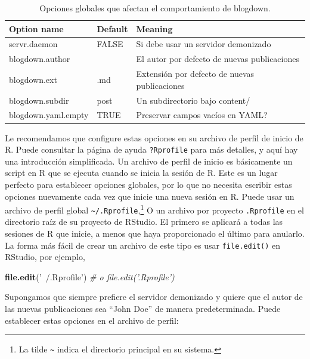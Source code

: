 \documentclass[12pt,]{krantz}
\makeatletter
\newenvironment{Shaded}{\begin{snugshade}}{\end{snugshade}}
\newcommand{\CommentTok}[1]{\textcolor[rgb]{0.56,0.35,0.01}{\textit{#1}}}
\newcommand{\KeywordTok}[1]{\textcolor[rgb]{0.13,0.29,0.53}{\textbf{#1}}}
\newcommand{\NormalTok}[1]{#1}
\newcommand{\StringTok}[1]{\textcolor[rgb]{0.31,0.60,0.02}{#1}}
\newenvironment{kframe}{%
\medskip{}
\setlength{\fboxsep}{.8em}
 \def\at@end@of@kframe{}%
 \ifinner\ifhmode%
  \def\at@end@of@kframe{\end{minipage}}%
  \begin{minipage}{\columnwidth}%
 \fi\fi%
 \def\FrameCommand##1{\hskip\@totalleftmargin \hskip-\fboxsep
 \colorbox{shadecolor}{##1}\hskip-\fboxsep
     \hskip-\linewidth \hskip-\@totalleftmargin \hskip\columnwidth}%
 \MakeFramed {\advance\hsize-\width
   \@totalleftmargin\z@ \linewidth\hsize
   \@setminipage}}%
 {\par\unskip\endMakeFramed%
 \at@end@of@kframe}
\renewenvironment{Shaded}{\begin{kframe}}{\end{kframe}}
\theoremstyle{definition}
\theoremstyle{definition}
\theoremstyle{definition}
\theoremstyle{remark}
\makeatother
\begin{document}
\begin{table}

\caption{\label{tab:global-options}Opciones globales que afectan el comportamiento de blogdown.}
\centering
\begin{tabular}[t]{lll}
\toprule
Option name & Default & Meaning\\
\midrule
servr.daemon & FALSE & Si debe usar un servidor demonizado\\
blogdown.author &  & El autor por defecto de nuevas publicaciones\\
blogdown.ext & .md & Extensión por defecto de nuevas publicaciones\\
blogdown.subdir & post & Un subdirectorio bajo content/\\
blogdown.yaml.empty & TRUE & Preservar campos vacíos en YAML?\\
\bottomrule
\end{tabular}
\end{table}

Le recomendamos que configure estas opciones en su archivo de perfil de
inicio de R. Puede consultar la página de ayuda \texttt{?Rprofile} para
más detalles, y aquí hay una introducción simplificada. Un archivo de
perfil de inicio es básicamente un script en R que se ejecuta cuando se
inicia la sesión de R. Este es un lugar perfecto para establecer
opciones globales, por lo que no necesita escribir estas opciones
nuevamente cada vez que inicie una nueva sesión en R. Puede usar un
archivo de perfil global \texttt{\textasciitilde{}/.Rprofile},\footnote{La
  tilde \texttt{\textasciitilde{}} indica el directorio principal en su
  sistema.} O un archivo por proyecto \texttt{.Rprofile} en el
directorio raíz de su proyecto de RStudio. El primero se aplicará a
todas las sesiones de R que inicie, a menos que haya proporcionado el
último para anularlo. La forma más fácil de crear un archivo de este
tipo es usar \texttt{file.edit()} en RStudio, por ejemplo,

\begin{Shaded}
\begin{Highlighting}[]
\KeywordTok{file.edit}\NormalTok{(}\StringTok{'~/.Rprofile'}\NormalTok{)}
\CommentTok{# o file.edit('.Rprofile')}
\end{Highlighting}
\end{Shaded}

Supongamos que siempre prefiere el servidor demonizado y quiere que el
autor de las nuevas publicaciones sea ``John Doe'' de manera
predeterminada. Puede establecer estas opciones en el archivo de perfil:
\end{document}
